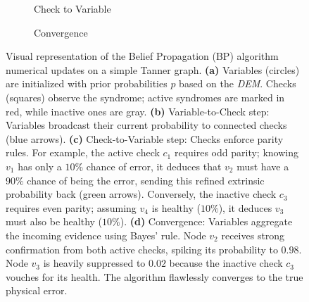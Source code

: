 \begin{figure}[hbt!]
    \vspace{0.6cm} %
    
    \begin{subfigure}[b]{0.45\textwidth}
        \centering
        \resizebox{\linewidth}{!}{
        
        }
        \caption{Check to Variable}
    \end{subfigure}
    \hfill
    \begin{subfigure}[b]{0.45\textwidth}
        \centering
        \caption{Convergence}
    \end{subfigure}

    \caption[Visual representation of the Belief Propagation (BP) algorithm numerical updates.]{Visual representation of the Belief Propagation (BP) algorithm numerical updates on a simple Tanner graph. \textbf{(a)} Variables (circles) are initialized with prior probabilities $p$ based on the \textit{DEM}. Checks (squares) observe the syndrome; active syndromes are marked in red, while inactive ones are gray. \textbf{(b)} Variable-to-Check step: Variables broadcast their current probability to connected checks (blue arrows). \textbf{(c)} Check-to-Variable step: Checks enforce parity rules. For example, the active check $c_1$ requires odd parity; knowing $v_1$ has only a $10\%$ chance of error, it deduces that $v_2$ must have a $90\%$ chance of being the error, sending this refined extrinsic probability back (green arrows). Conversely, the inactive check $c_3$ requires even parity; assuming $v_4$ is healthy ($10\%$), it deduces $v_3$ must also be healthy ($10\%$). \textbf{(d)} Convergence: Variables aggregate the incoming evidence using Bayes' rule. Node $v_2$ receives strong confirmation from both active checks, spiking its probability to $0.98$. Node $v_3$ is heavily suppressed to $0.02$ because the inactive check $c_3$ vouches for its health. The algorithm flawlessly converges to the true physical error.}
    \label{fig:bp_convergence}
\end{figure}


